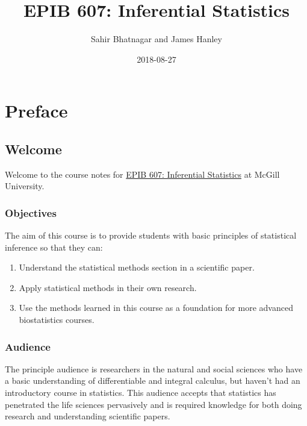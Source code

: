 \documentclass[]{book}
\title{EPIB 607: Inferential Statistics}
\author{Sahir Bhatnagar and James Hanley}
\date{2018-08-27}
\providecommand{\tightlist}{%
  \setlength{\itemsep}{0pt}\setlength{\parskip}{0pt}}
\providecommand{\tightlist}{%
  \setlength{\itemsep}{0pt}\setlength{\parskip}{0pt}}
\theoremstyle{definition}
\theoremstyle{definition}
\theoremstyle{definition}
\theoremstyle{remark}
\begin{document}
\maketitle

{
\setcounter{tocdepth}{1}
\tableofcontents
}
\part{Preface}\label{part-preface}

\chapter*{Welcome}\label{welcome}

Welcome to the course notes for
\href{https://www.mcgill.ca/study/2018-2019/courses/epib-607}{EPIB 607:
Inferential Statistics} at McGill University.

\section*{Objectives}\label{objectives}

The aim of this course is to provide students with basic principles of
statistical inference so that they can:

\begin{enumerate}
\def\labelenumi{\arabic{enumi}.}
\tightlist
\item
  Understand the statistical methods section in a scientific paper.\\
\item
  Apply statistical methods in their own research.\\
\item
  Use the methods learned in this course as a foundation for more
  advanced biostatistics courses.
\end{enumerate}

\section*{Audience}\label{audience}

The principle audience is researchers in the natural and social sciences
who have a basic understanding of differentiable and integral calculus,
but haven't had an introductory course in statistics. This audience
accepts that statistics has penetrated the life sciences pervasively and
is required knowledge for both doing research and understanding
scientific papers.
\end{document}

